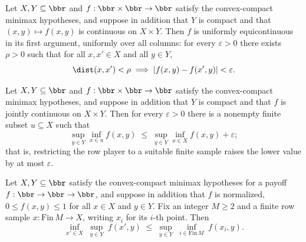 \begin{theorem}
\label{OnlineLearning.theorem71_uniformEquicontinuity_of_jointContinuous_compact}
\leanok
{}
Let $X, Y \subseteq \bbr$ and $f : \bbr \times \bbr \to \bbr$ satisfy the convex-compact
minimax hypotheses, and suppose in addition that $Y$ is compact and that $(x,y) \mapsto
f(x,y)$ is continuous on $X \times Y$. Then $f$ is uniformly equicontinuous in its first
argument, uniformly over all columns: for every $\varepsilon > 0$ there exists $\rho >
0$ such that for all $x, x' \in X$ and all $y \in Y$,
\[
  \dist(x, x') < \rho \;\Longrightarrow\; |f(x,y) - f(x',y)| < \varepsilon.
\]
\end{theorem}

\begin{theorem}
\label{OnlineLearning.theorem71_compactApproximation_of_jointContinuous_compact}
\leanok
{}
Let $X, Y \subseteq \bbr$ and $f : \bbr \times \bbr \to \bbr$ satisfy the convex-compact
minimax hypotheses, and suppose in addition that $Y$ is compact and that $f$ is jointly
continuous on $X \times Y$. Then for every $\varepsilon > 0$ there is a nonempty finite
subset $u \subseteq X$ such that
\[
  \sup_{y \in Y} \inf_{x \in u} f(x,y)
    \;\le\;
  \sup_{y \in Y} \inf_{x \in X} f(x,y) + \varepsilon;
\]
that is, restricting the row player to a suitable finite sample raises the lower value
by at most $\varepsilon$.
\end{theorem}

\begin{theorem}
\label{OnlineLearning.theorem71_finiteIndexedNoRegretBound_normalized}
\leanok
{}
Let $X, Y \subseteq \bbr$ satisfy the convex-compact minimax hypotheses for a payoff $f
: \bbr \to \bbr \to \bbr$, and suppose in addition that $f$ is normalized, $0 \le f(x,y)
\le 1$ for all $x \in X$ and $y \in Y$. Fix an integer $M \ge 2$ and a finite row sample
$x : \mathrm{Fin}\,M \to X$, writing $x_i$ for its $i$-th point. Then
\[
  \inf_{x' \in X}\; \sup_{y \in Y}\; f(x', y)
    \;\le\;
  \sup_{y \in Y}\; \inf_{i \in \mathrm{Fin}\,M}\; f(x_i, y).
\]
\end{theorem}

